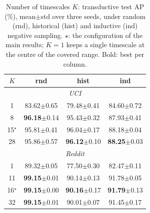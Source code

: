 \begin{table}[t]
\caption{Number of timescales $K$: transductive test AP (\%), mean{\tiny$\pm$std} over three seeds, under random (rnd), historical (hist) and inductive (ind) negative sampling. $\star$: the configuration of the main results; $K=1$ keeps a single timescale at the centre of the covered range. Bold: best per column.}
\label{tab:a1_scales}
\centering
\footnotesize
\setlength{\tabcolsep}{3pt}
\renewcommand{\arraystretch}{0.92}
\begin{tabular}{cccc}
\toprule
$K$ & rnd & hist & ind \\
\midrule
\multicolumn{4}{c}{\textit{UCI}} \\
\midrule
1 & 83.62{\tiny$\pm$0.65} & 79.48{\tiny$\pm$0.41} & 84.60{\tiny$\pm$0.72} \\
8 & \textbf{96.18}{\tiny$\pm$0.14} & 95.43{\tiny$\pm$0.32} & 87.93{\tiny$\pm$0.41} \\
15$^\star$ & 95.81{\tiny$\pm$0.41} & 96.04{\tiny$\pm$0.17} & 88.18{\tiny$\pm$0.04} \\
28 & 95.86{\tiny$\pm$0.57} & \textbf{96.12}{\tiny$\pm$0.10} & \textbf{88.25}{\tiny$\pm$0.03} \\
\midrule
\multicolumn{4}{c}{\textit{Reddit}} \\
\midrule
1 & 89.32{\tiny$\pm$0.05} & 77.50{\tiny$\pm$0.30} & 82.47{\tiny$\pm$0.11} \\
11 & \textbf{99.15}{\tiny$\pm$0.01} & 90.14{\tiny$\pm$0.13} & 91.78{\tiny$\pm$0.05} \\
16$^\star$ & \textbf{99.15}{\tiny$\pm$0.00} & \textbf{90.16}{\tiny$\pm$0.17} & \textbf{91.79}{\tiny$\pm$0.13} \\
32 & \textbf{99.15}{\tiny$\pm$0.01} & 90.01{\tiny$\pm$0.07} & 91.45{\tiny$\pm$0.17} \\
\bottomrule
\end{tabular}
\end{table}
